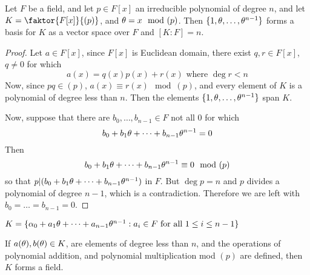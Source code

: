 \begin{theorem}\label{lemma_8.1.6}
  Let $F$ be a field, and let  $p \in F[x]$ an irreducible polynomial of
  degree $n$, and let  $K=\faktor{F[x]}{(p)}$, and $\theta=x \mod{(p)}$. Then
  $\{1, \theta, \dots, \theta^{n-1}\}$ forms a basis for $K$ as a vector space over
  $F$ and $[K:F]=n$.
\end{theorem}
\begin{proof}
  Let $a \in F[x]$, since $F[x]$ is Euclidean domain, there exist $q,r \in
  F[x]$, $q \neq 0$ for which
  \begin{equation*}
    a(x)=q(x)p(x)+r(x) \text{ where } \deg{r}<n
  \end{equation*}
  Now, since $pq \in (p)$, $a(x) \equiv r(x) \mod{(p)}$, and every element of
  $K$ is a polynomial of degree less than $n$. Then the elements $\{1, \theta,
  \dots, \theta^{n-1}\}$ span $K$.

  Now, suppose that there are  $b_0, \dots, b_{n-1} \in F$ not all $0$ for
  which
  \begin{equation*}
    b_0+b_1\theta+\dots+b_{n-1}\theta^{n-1}=0
  \end{equation*}
  Then
  \begin{equation*}
    b_0+b_1\theta+\dots+b_{n-1}\theta^{n-1} \equiv 0 \mod{(p)}
  \end{equation*}
  so that $p|(b_0+b_1\theta+\dots+b_{n-1}\theta^{n-1})$ in $F$. But  $\deg{p}=n$ and
  $p$ divides a polynomial of degree  $n-1$, which is a contradiction.
  Therefore we are left with  $b_0=\dots=b_{n-1}=0$.
\end{proof}
\begin{corollary}
  $K=\{\alpha_0+a_1\theta+\dots+a_{n-1}\theta^{n-1} : a_i \in F \text{ for all } 1 \leq
  i \leq n-1\}$
\end{corollary}
\begin{corollary}
  If $a(\theta),b(\theta) \in K$, are elements of degree less than $n$, and the
  operations of polynomial addition, and polynomial multiplication mod
  $(p)$ are defined, then $K$ forms a field.
\end{corollary}

